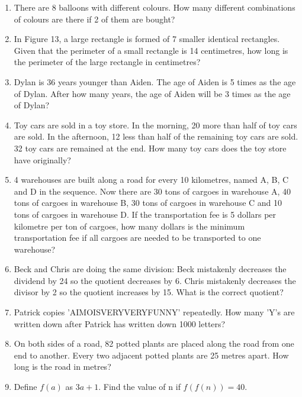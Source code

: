 \documentclass[11pt]{scrartcl}
\begin{document}
\begin{enumerate}
    \item There are 8 balloons with different colours. How many different combinations of colours are there if 2 of them are bought?
    
    \item In Figure 13, a large rectangle is formed of 7 smaller identical rectangles. Given that the perimeter of a small rectangle is 14 centimetres, how long is the perimeter of the large rectangle in centimetres?
    
    \item Dylan is 36 years younger than Aiden. The age of Aiden is 5 times as the age of Dylan. After how many years, the age of Aiden will be 3 times as the age of Dylan?
    
    \item Toy cars are sold in a toy store. In the morning, 20 more than half of toy cars are sold. In the afternoon, 12 less than half of the remaining toy cars are sold. 32 toy cars are remained at the end. How many toy cars does the toy store have originally?
    
    \item 4 warehouses are built along a road for every 10 kilometres, named A, B, C and D in the sequence. Now there are 30 tons of cargoes in warehouse A, 40 tons of cargoes in warehouse B, 30 tons of cargoes in warehouse C and 10 tons of cargoes in warehouse D. If the transportation fee is 5 dollars per kilometre per ton of cargoes, how many dollars is the minimum transportation fee if all cargoes are needed to be transported to one warehouse?
    
    \item Beck and Chris are doing the same division: Beck mistakenly decreases the dividend by 24 so the quotient decreases by 6. Chris mistakenly decreases the divisor by 2 so the quotient increases by 15. What is the correct quotient?
    
    \item Patrick copies 'AIMOISVERYVERYFUNNY' repeatedly. How many 'Y's are written down after Patrick has written down 1000 letters?
    
    \item On both sides of a road, 82 potted plants are placed along the road from one end to another. Every two adjacent potted plants are 25 metres apart. How long is the road in metres?
    
    \item Define $f(a)$ as $3a + 1$. Find the value of n if $f(f(n)) = 40$.
\end{enumerate}
\end{document}
